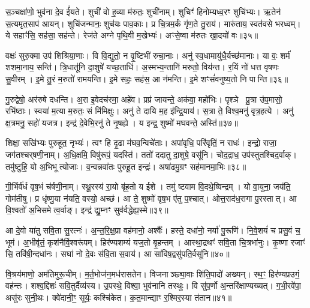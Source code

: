 स॒ञ्चक्षा॑णो॒ भुव॑ना दे॒व ई॑यते।
शुची॑ वो ह॒व्या म॑रुतः॒ शुची॑नाम्।
शुचिꣳ॑ हिनोम्यध्व॒रꣳ शुचि॑भ्यः।
ऋ॒तेन॑ स॒त्यमृत॒साप॑ आयन्।
शुचि॑जन्मानः॒ शुच॑यः पाव॒काः।
प्र चि॒त्रम॒र्कं गृ॑ण॒ते तु॒राय॑।
मारु॑ताय॒ स्वत॑वसे भरध्वम्।
ये सहाꣳ॑सि॒ सह॑सा॒ सह॑न्ते।
रेज॑ते अग्ने पृथि॒वी म॒खेभ्यः॑।
अꣳसे॒ष्वा म॑रुतः खा॒दयो॑ वः॥३५॥

वक्षः॑ सुरु॒क्मा उप॑ शिश्रिया॒णाः।
वि वि॒द्युतो॒ न वृ॒ष्टिभी॑ रुचा॒नाः।
अनु॑ स्व॒धामायु॑धै॒र्यच्छ॑मानाः।
या वः॒ शर्म॑ शशमा॒नाय॒ सन्ति॑।
त्रि॒धातू॑नि दा॒शुषे॑ यच्छ॒ताधि॑।
अ॒स्मभ्य॒न्तानि॑ मरुतो॒ विय॑न्त।
र॒यिं नो॑ धत्त वृषणः सु॒वीरम्।
इ॒मे तु॒रं म॒रुतो॑ रामयन्ति।
इ॒मे सहः॒ सह॑स॒ आ न॑मन्ति।
इ॒मे शꣳसं॑वनुष्य॒तो नि पान्ति॥३६॥

गु॒रुद्वेषो॒ अर॑रुषे दधन्ति।
अ॒रा इ॒वेदच॑रमा॒ अहे॑व।
प्रप्र॑ जायन्ते॒ अक॑वा॒ महो॑भिः।
पृश्ञे प्रु॒त्रा उ॑प॒मासो॒ रभि॑ष्ठाः।
स्वया॑ म॒त्या म॒रुतः॒ सं मि॑मिक्षुः।
अनु॑ ते दायि म॒ह इ॑न्द्रि॒याय॑।
स॒त्रा ते॒ विश्व॒मनु॑ वृत्र॒हत्ये।
अनु॑ क्ष॒त्रमनु॒ सहो॑ यजत्र।
इन्द्र॑ दे॒वेभि॒रनु॑ ते नृ॒षह्ये।
य इन्द्र॒ शुष्मो॑ मघवन्ते॒ अस्ति॑॥३७॥

शिक्षा॒ सखि॑भ्यः पुरुहूत॒ नृभ्यः॑।
त्वꣳ हि दृ॒ढा म॑घव॒न्विचे॑ताः।
अपा॑वृधि॒ परि॑वृतिं॒ न राधः॑।
इन्द्रो॒ राजा॒ जग॑तश्चर्‌\mbox{}षणी॒नाम्।
अ॒धि॒क्षमि॒ विषु॑रूपं॒ यदस्ति॑।
ततो॑ ददातु दा॒शुषे॒ वसू॑नि।
चोद॒द्राध॒ उप॑स्तुतश्चिद॒र्वाक्।
तमु॑ष्टुहि॒ यो अ॒भिभूत्योजाः।
व॒न्वन्नवा॑तः पुरुहू॒त इन्द्रः॑।
अषा॑ढमु॒ग्रꣳ सह॑मानमा॒भिः॥३८॥

गी॒र्भिर्व॑र्ध वृष॒भं च॑र्\mbox{}षणी॒नाम्।
स्थू॒रस्य॑ रा॒यो बृ॑ह॒तो य ईशे।
तमु॑ ष्टवाम वि॒दथे॒ष्विन्द्रम्।
यो वा॒युना॒ जय॑ति॒ गोम॑तीषु।
प्र धृ॑ष्णु॒या न॑यति॒ वस्यो॒ अच्छ॑।
आ ते॒ शुष्मो॑ वृष॒भ ए॑तु प॒श्चात्।
ओत्त॒राद॑ध॒रागा पु॒रस्तात्।
आ वि॒श्वतो॑ अ॒भिसमेत्व॒र्वाङ्।
इन्द्र॑ द्यु॒म्नꣳ सुव॑र्वद्धेह्य॒स्मे॥३९॥\anuvakamend[व॒राहैर्वि॒श्वहा॑\-ऽजनिष्ट पू॒षोद्वरी॑वृजत्खा॒दयो॑ वः पा॒न्त्यस्त्या॒भिर्नव॑ च]

आ दे॒वो या॑तु सवि॒ता सु॒रत्नः॑।
अ॒न्त॒रि॒क्ष॒प्रा वह॑मानो॒ अश्वैः᳚।
हस्ते॒ दधा॑नो॒ नर्या॑ पु॒रूणि॑।
नि॒वे॒शयं॑ च प्रसु॒वं च॒ भूम॑।
अ॒भीवृ॑तं॒ कृश॑नैर्वि॒श्वरू॑पम्।
हिर॑ण्यशम्यं यज॒तो बृ॒हन्तम्।
आस्था॒द्रथꣳ॑ सवि॒ता चि॒त्रभा॑नुः।
कृ॒ष्णा रजाꣳ॑ सि॒ तवि॑षी॒न्दधा॑नः।
सघा॑ नो दे॒वः स॑वि॒ता स॒वाय॑।
आ सा॑विष॒द्वसु॑पति॒र्वसू॑नि॥४०॥

वि॒श्रय॑माणो॒ अम॑तिमुरू॒चीम्।
म॒र्त॒भोज॑न॒मध॑रासतेन।
विजनाञ्छ्या॒वाः शि॑ति॒पादो॑ अख्यन्।
रथ॒ꣳ॒ हिर॑ण्यप्रउगं॒ वह॑न्तः।
शश्व॒द्दिशः॑ सवि॒तुर्दैव्य॑स्य।
उ॒पस्थे॒ विश्वा॒ भुव॑नानि तस्थुः।
वि सु॑प॒र्णो अ॒न्तरि॑क्षाण्यख्यत्।
ग॒भी॒रवे॑पा॒ असु॑रः सुनी॒थः।
क्वे॑दानी॒ꣳ॒ सूर्यः॒ कश्चि॑केत।
क॒त॒मान्द्याꣳ र॒श्मिर॒स्या त॑तान॥४१॥


